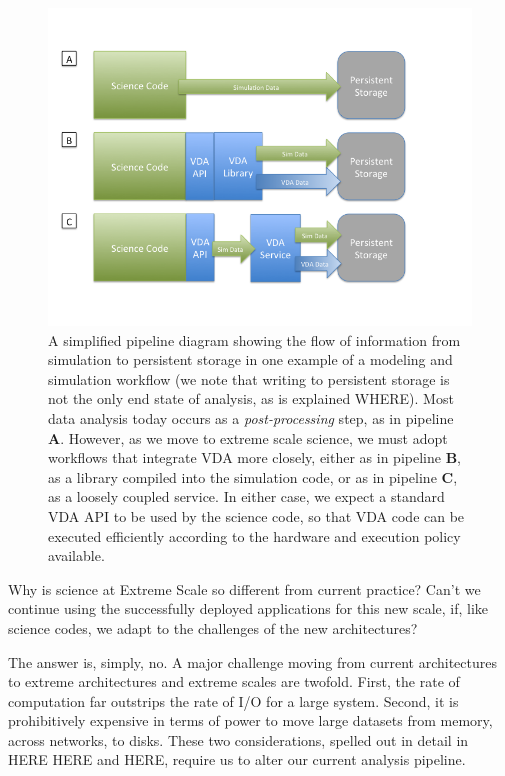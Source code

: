
\begin{figure}
\begin{center}
\includegraphics[width=6in]{figures/three-data-flows}
\end{center}
\caption{ A simplified pipeline diagram showing the flow of information from simulation to persistent storage in one example of a modeling and simulation workflow (we note that writing to persistent storage is not the only end state of analysis, as is explained WHERE).  Most data analysis today occurs as a \emph{post-processing} step, as in pipeline \textbf{A}.  However, as we move to extreme scale science, we must adopt workflows that integrate VDA more closely, either as in pipeline \textbf{B}, as a library compiled into the simulation code, or as in pipeline \textbf{C}, as a loosely coupled service.  In either case, we expect a standard VDA API to be used by the science code, so that VDA code can be executed efficiently according to the hardware and execution policy available.
\label{simplepipeline}}
\end{figure}

Why is science at Extreme Scale so different from current practice?  Can't we
continue using the successfully deployed applications for this new scale, if, like science codes, we adapt to the challenges of the new architectures?

The answer is, simply, no.  A major challenge moving from current architectures to extreme architectures and extreme scales are twofold.  First, the rate of 
computation far outstrips the rate of I/O for a large system.  Second, it is
prohibitively expensive in terms of power to move large datasets from memory,
across networks, to disks.  These two considerations, spelled out in detail in
HERE HERE and HERE, require us to alter our current analysis pipeline.

